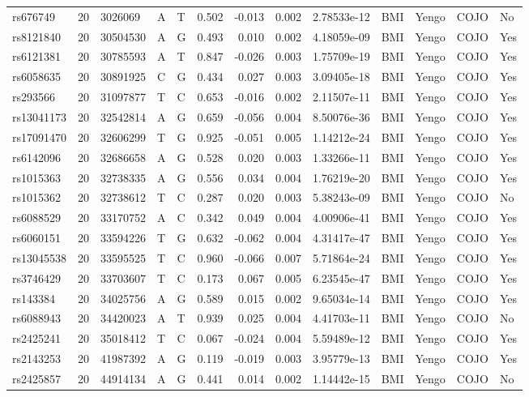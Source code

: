 \documentclass[11pt,twoside]{bristolthesis}
\begin{document}
\begin{longtable}[t]{lrlllrrrlllll}
rs676749 & 20 & 3026069 & A & T & 0.502 & -0.013 & 0.002 & 2.78533e-12 & BMI & Yengo & COJO & No\\
\addlinespace
rs8121840 & 20 & 30504530 & A & G & 0.493 & 0.010 & 0.002 & 4.18059e-09 & BMI & Yengo & COJO & Yes\\
rs6121381 & 20 & 30785593 & A & T & 0.847 & -0.026 & 0.003 & 1.75709e-19 & BMI & Yengo & COJO & Yes\\
rs6058635 & 20 & 30891925 & C & G & 0.434 & 0.027 & 0.003 & 3.09405e-18 & BMI & Yengo & COJO & Yes\\
rs293566 & 20 & 31097877 & T & C & 0.653 & -0.016 & 0.002 & 2.11507e-11 & BMI & Yengo & COJO & Yes\\
rs13041173 & 20 & 32542814 & A & G & 0.659 & -0.056 & 0.004 & 8.50076e-36 & BMI & Yengo & COJO & Yes\\
\addlinespace
rs17091470 & 20 & 32606299 & T & G & 0.925 & -0.051 & 0.005 & 1.14212e-24 & BMI & Yengo & COJO & Yes\\
rs6142096 & 20 & 32686658 & A & G & 0.528 & 0.020 & 0.003 & 1.33266e-11 & BMI & Yengo & COJO & Yes\\
rs1015363 & 20 & 32738335 & A & G & 0.556 & 0.034 & 0.004 & 1.76219e-20 & BMI & Yengo & COJO & Yes\\
rs1015362 & 20 & 32738612 & T & C & 0.287 & 0.020 & 0.003 & 5.38243e-09 & BMI & Yengo & COJO & No\\
rs6088529 & 20 & 33170752 & A & C & 0.342 & 0.049 & 0.004 & 4.00906e-41 & BMI & Yengo & COJO & Yes\\
\addlinespace
rs6060151 & 20 & 33594226 & T & G & 0.632 & -0.062 & 0.004 & 4.31417e-47 & BMI & Yengo & COJO & Yes\\
rs13045538 & 20 & 33595525 & T & C & 0.960 & -0.066 & 0.007 & 5.71864e-24 & BMI & Yengo & COJO & Yes\\
rs3746429 & 20 & 33703607 & T & C & 0.173 & 0.067 & 0.005 & 6.23545e-47 & BMI & Yengo & COJO & Yes\\
rs143384 & 20 & 34025756 & A & G & 0.589 & 0.015 & 0.002 & 9.65034e-14 & BMI & Yengo & COJO & Yes\\
rs6088943 & 20 & 34420023 & A & T & 0.939 & 0.025 & 0.004 & 4.41703e-11 & BMI & Yengo & COJO & No\\
\addlinespace
rs2425241 & 20 & 35018412 & T & C & 0.067 & -0.024 & 0.004 & 5.59489e-12 & BMI & Yengo & COJO & Yes\\
rs2143253 & 20 & 41987392 & A & G & 0.119 & -0.019 & 0.003 & 3.95779e-13 & BMI & Yengo & COJO & Yes\\
rs2425857 & 20 & 44914134 & A & G & 0.441 & 0.014 & 0.002 & 1.14442e-15 & BMI & Yengo & COJO & No\\

\end{longtable}
\end{document}
